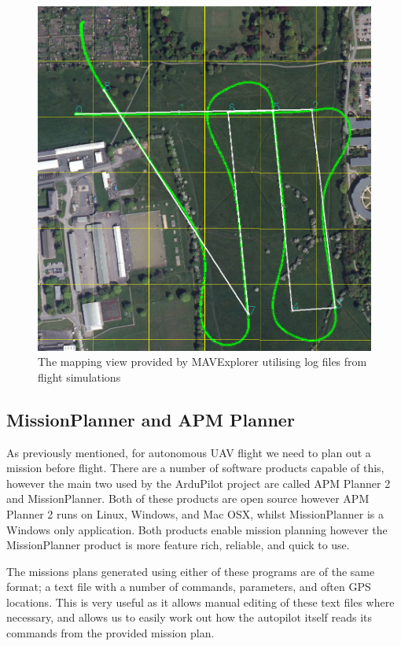 \begin{figure}[htbp!] 
\centering    
\includegraphics[width=\textwidth]{MAVExplorer}
\caption[MAVExplorer Example]{The mapping view provided by MAVExplorer utilising log files from flight simulations}
\label{fig:mavexplorer}
\end{figure}

\subsection{MissionPlanner and APM Planner}
\label{intro:planner}

As previously mentioned, for autonomous UAV flight we need to plan out a mission before flight. There are a number of software products capable of this, however the main two used by the ArduPilot project are called APM Planner 2 and MissionPlanner. Both of these products are open source however APM Planner 2 runs on Linux, Windows, and Mac OSX, whilst MissionPlanner is a Windows only application. Both products enable mission planning however the MissionPlanner product is more feature rich, reliable, and quick to use. 

The missions plans generated using either of these programs are of the same format; a text file with a number of commands, parameters, and often GPS locations. This is very useful as it allows manual editing of these text files where necessary, and allows us to easily work out how the autopilot itself reads its commands from the provided mission plan. 

